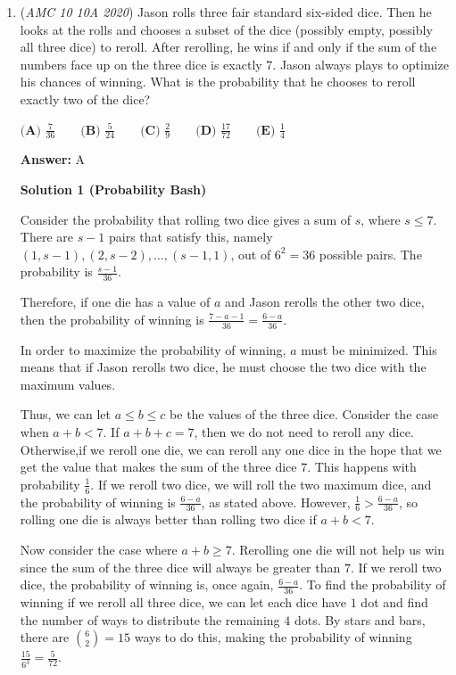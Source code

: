 \begin{enumerate}
	\item (\textit{AMC 10 10A 2020}) Jason rolls three fair standard six-sided dice. Then he looks at the rolls and chooses a subset of the dice (possibly empty, possibly all three dice) to reroll. After rerolling, he wins if and only if the sum of the numbers face up on the three dice is exactly $7.$ Jason always plays to optimize his chances of winning. What is the probability that he chooses to reroll exactly two of the dice?


 $\textbf{(A) } \frac{7}{36} \qquad\textbf{(B) } \frac{5}{24} \qquad\textbf{(C) } \frac{2}{9} \qquad\textbf{(D) } \frac{17}{72} \qquad\textbf{(E) } \frac{1}{4}$

 \textbf{Answer: }A



\textbf{Solution 1 (Probability Bash)}

Consider the probability that rolling two dice gives a sum of $s$, where $s \leq 7$. There are $s - 1$ pairs that satisfy this, namely $(1, s - 1), (2, s - 2), \ldots, (s - 1, 1)$, out of $6^2 = 36$ possible pairs. The probability is $\frac{s - 1}{36}$.

 Therefore, if one die has a value of $a$ and Jason rerolls the other two dice, then the probability of winning is $\frac{7 - a - 1}{36} = \frac{6 - a}{36}$.

 In order to maximize the probability of winning, $a$ must be minimized. This means that if Jason rerolls two dice, he must choose the two dice with the maximum values.

 Thus, we can let $a \leq b \leq c$ be the values of the three dice. Consider the case when $a + b < 7$. If $a + b + c = 7$, then we do not need to reroll any dice. Otherwise,if we reroll one die, we can reroll any one dice in the hope that we get the value that makes the sum of the three dice $7$. This happens with probability $\frac16$. If we reroll two dice, we will roll the two maximum dice, and the probability of winning is $\frac{6 - a}{36}$, as stated above. However, $\frac16 > \frac{6 - a}{36}$, so rolling one die is always better than rolling two dice if $a + b < 7$.

 Now consider the case where $a + b \geq 7$. Rerolling one die will not help us win since the sum of the three dice will always be greater than $7$. If we reroll two dice, the probability of winning is, once again, $\frac{6 - a}{36}$. To find the probability of winning if we reroll all three dice, we can let each dice have $1$ dot and find the number of ways to distribute the remaining $4$ dots. By stars and bars, there are ${6\choose2} = 15$ ways to do this, making the probability of winning $\frac{15}{6^3} = \frac5{72}$.


\end{enumerate}
